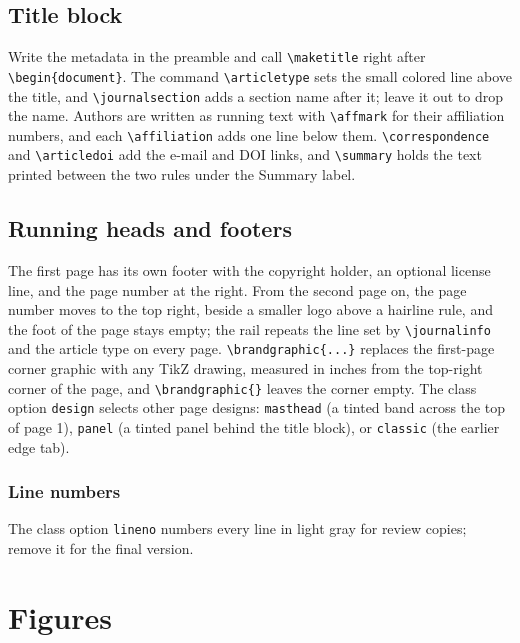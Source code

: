 \subsection{Title block}

Write the metadata in the preamble and call \texttt{\textbackslash maketitle} right after \texttt{\textbackslash begin\{document\}}. The command \texttt{\textbackslash articletype} sets the small colored line above the title, and \texttt{\textbackslash journalsection} adds a section name after it; leave it out to drop the name. Authors are written as running text with \texttt{\textbackslash affmark} for their affiliation numbers, and each \texttt{\textbackslash affiliation} adds one line below them. \texttt{\textbackslash correspondence} and \texttt{\textbackslash articledoi} add the e-mail and DOI links, and \texttt{\textbackslash summary} holds the text printed between the two rules under the Summary label.

\subsection{Running heads and footers}

The first page has its own footer with the copyright holder, an optional license line, and the page number at the right. From the second page on, the page number moves to the top right, beside a smaller logo above a hairline rule, and the foot of the page stays empty; the rail repeats the line set by \texttt{\textbackslash journalinfo} and the article type on every page. \texttt{\textbackslash brandgraphic\{...\}} replaces the first-page corner graphic with any TikZ drawing, measured in inches from the top-right corner of the page, and \texttt{\textbackslash brandgraphic\{\}} leaves the corner empty. The class option \texttt{design} selects other page designs: \texttt{masthead} (a tinted band across the top of page 1), \texttt{panel} (a tinted panel behind the title block), or \texttt{classic} (the earlier edge tab).

\subsubsection{Line numbers}
The class option \texttt{lineno} numbers every line in light gray for review copies; remove it for the final version.

\section{Figures}

